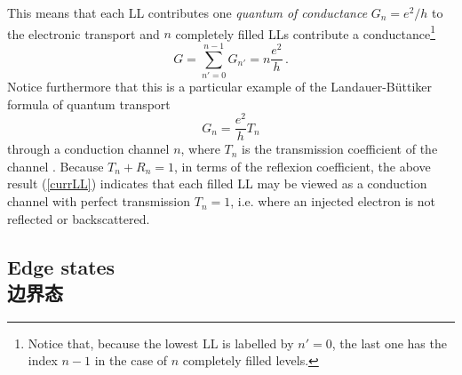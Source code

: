 \documentclass[10pt]{book}
\newcommand{\beq}{\begin{equation}}
\newcommand{\eeq}{\end{equation}}
\begin{document}
This means that each LL contributes one {\sl quantum of conductance} $G_n=e^2/h$ to the electronic transport
and $n$ completely filled LLs contribute a conductance\footnote{Notice that, because the lowest LL is labelled by
$n'=0$, the last one has the index $n-1$ in the case of $n$ completely filled levels.}
\beq\label{LLcond}
G=\sum_{n'=0}^{n-1} G_{n'} = n\frac{e^2}{h}\, .
\eeq 
Notice furthermore that this is a particular example of the Landauer-B\"uttiker formula of quantum transport
$$G_n=\frac{e^2}{h} T_n$$
through a conduction channel $n$, where $T_n$ is the transmission coefficient of the channel
\cite{BILP,butt,datta}. Because $T_n + R_n=1$,
in terms of the reflexion coefficient, the above result (\ref{currLL}) indicates that each filled LL may be viewed
as a conduction channel with perfect transmission $T_n=1$, i.e. where an injected electron is not reflected or backscattered. 



\subsection[边界态]{Edge states\\\bf 边界态}
\end{document}
